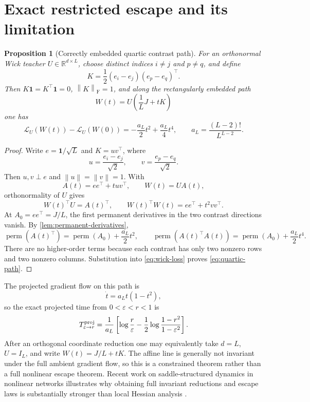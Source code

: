 \documentclass[11pt]{article}
\newtheorem{proposition}[theorem]{Proposition}
\newcommand{\R}{\mathbb{R}}
\newcommand{\one}{\mathbf{1}}
\newcommand{\perm}{\operatorname{perm}}
\newcommand{\norm}[1]{\left\lVert #1\right\rVert}
\newcommand{\F}{\mathrm{F}}
\begin{document}
\section{Exact restricted escape and its limitation}

\begin{proposition}[Correctly embedded quartic contrast path]
\label{prop:quartic-path}
For an orthonormal Wick teacher $U\in\R^{d\times L}$, choose distinct indices $i\ne j$ and $p\ne q$, and define
\[
K=\frac12(e_i-e_j)(e_p-e_q)^\top.
\]
Then $K\one=K^\top\one=0$, $\norm K_\F=1$, and along the rectangularly embedded path
\[
W(t)=U\left(\frac1LJ+tK\right)
\]
one has
\begin{equation}
\mathcal L_U(W(t))-\mathcal L_U(W(0))
=-\frac{a_L}{2}t^2+\frac{a_L}{4}t^4,
\qquad
 a_L=\frac{(L-2)!}{L^{L-2}}.
\label{eq:quartic-path}
\end{equation}
\end{proposition}

\begin{proof}
Write $e=\one/\sqrt L$ and $K=uv^\top$, where
\[
u=\frac{e_i-e_j}{\sqrt2},
\qquad
v=\frac{e_p-e_q}{\sqrt2}.
\]
Then $u,v\perp e$ and $\norm u=\norm v=1$.  With
\[
A(t)=ee^\top+tuv^\top,
\qquad W(t)=UA(t),
\]
orthonormality of $U$ gives
\[
W(t)^\top U=A(t)^\top,
\qquad
W(t)^\top W(t)=ee^\top+t^2vv^\top.
\]
At $A_0=ee^\top=J/L$, the first permanent derivatives in the two contrast directions vanish.  By \cref{lem:permanent-derivatives},
\[
\perm(A(t)^\top)=\perm(A_0)+\frac{a_L}{2}t^2,
\qquad
\perm(A(t)^\top A(t))=\perm(A_0)+\frac{a_L}{2}t^4.
\]
There are no higher-order terms because each contrast has only two nonzero rows and two nonzero columns.  Substitution into \eqref{eq:wick-loss} proves \eqref{eq:quartic-path}.
\end{proof}

The projected gradient flow on this path is
\[
\dot t=a_Lt(1-t^2),
\]
so the exact projected time from $0<\varepsilon<r<1$ is
\begin{equation}
T_{\varepsilon\to r}^{\rm proj}
=\frac1{a_L}\left[
\log\frac r\varepsilon
-\frac12\log\frac{1-r^2}{1-\varepsilon^2}
\right].
\end{equation}
After an orthogonal coordinate reduction one may equivalently take $d=L$, $U=I_L$, and write $W(t)=J/L+tK$.  The affine line is generally not invariant under the full ambient gradient flow, so this is a constrained theorem rather than a full nonlinear escape theorem.  Recent work on saddle-structured dynamics in nonlinear networks illustrates why obtaining full invariant reductions and escape laws is substantially stronger than local Hessian analysis \cite{rawal_deweese}.
\end{document}
